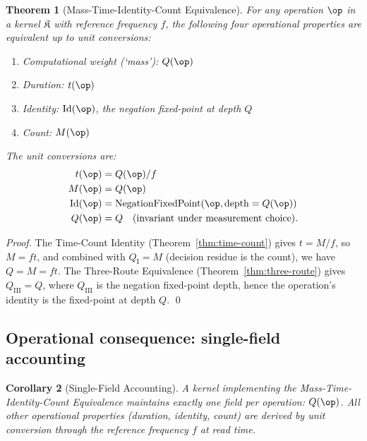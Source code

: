\documentclass[twocolumn,11pt,a4paper]{article}
\newtheorem{theorem}{Theorem}[section]
\newtheorem{corollary}[theorem]{Corollary}
\newcommand{\Kernel}{\mathfrak{K}}
\newcommand{\Mcount}{M}
\newcommand{\Qweight}{Q}
\begin{document}
\begin{theorem}[Mass-Time-Identity-Count Equivalence]
\label{thm:mtic}
For any operation $\op$ in a kernel $\Kernel$ with reference frequency $f$, the following four operational properties are equivalent up to unit conversions:
\begin{enumerate}[nosep,label=(\arabic*)]
\item \emph{Computational weight (`mass')}: $\Qweight(\op)$
\item \emph{Duration}: $t(\op)$
\item \emph{Identity}: $\mathrm{Id}(\op)$, the negation fixed-point at depth $\Qweight$
\item \emph{Count}: $\Mcount(\op)$
\end{enumerate}
The unit conversions are:
\begin{align}
t(\op) &= \Qweight(\op)/f \\
\Mcount(\op) &= \Qweight(\op) \\
\mathrm{Id}(\op) &= \mathrm{NegationFixedPoint}(\op, \mathrm{depth}=\Qweight(\op)) \\
\Qweight(\op) &= \Qweight \quad \text{(invariant under measurement choice)}.
\end{align}
\end{theorem}

\begin{proof}
The Time-Count Identity (Theorem~\ref{thm:time-count}) gives $t = \Mcount/f$, so $\Mcount = ft$, and combined with $\Qweight_\mathrm{I} = \Mcount$ (decision residue is the count), we have $\Qweight = \Mcount = ft$. The Three-Route Equivalence (Theorem~\ref{thm:three-route}) gives $\Qweight_\mathrm{III} = \Qweight$, where $\Qweight_\mathrm{III}$ is the negation fixed-point depth, hence the operation's identity is the fixed-point at depth $\Qweight$. \qed
\end{proof}

\subsection{Operational consequence: single-field accounting}

\begin{corollary}[Single-Field Accounting]
\label{cor:single-field}
A kernel implementing the Mass-Time-Identity-Count Equivalence maintains exactly one field per operation: $\Qweight(\op)$. All other operational properties (duration, identity, count) are derived by unit conversion through the reference frequency $f$ at read time.
\end{corollary}
\end{document}
